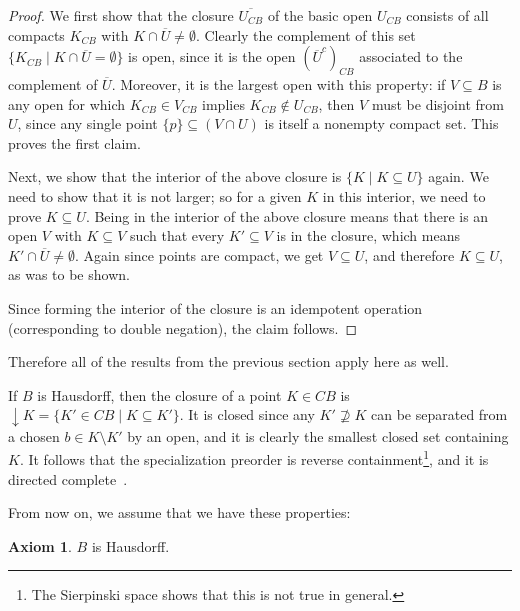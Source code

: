 \documentclass[11pt, oneside, article]{memoir}
\theoremstyle{plain}
\theoremstyle{definition}
\newtheorem{axiom}{Axiom}
\theoremstyle{remark}
\renewcommand{\ss}{\subseteq}
\newcommand{\ol}[1]{\overline{#1}}
\newcommand{\BaseSpace}{B}
\begin{document}
\begin{proof}
We first show that the closure $\ol{U_{C\BaseSpace}}$ of the basic open $U_{C\BaseSpace}$ consists of all compacts $K_{C\BaseSpace}$ with $K\cap\overline{U} \neq \emptyset$. Clearly the complement of this set $\{K_{C\BaseSpace}\mid K\cap\ol{U}=\emptyset\}$ is open, since it is the open $(\ol{U}^c)_{C\BaseSpace}$ associated to the complement of $\overline{U}$. Moreover, it is the largest open with this property: if $V\subseteq B$ is any open for which $K_{C\BaseSpace}\in V_{C\BaseSpace}$ implies $K_{C\BaseSpace} \not\in U_{C\BaseSpace}$, then $V$ must be disjoint from $U$, since any single point $\{p\}\ss(V\cap U)$ is itself a nonempty compact set. This proves the first claim.

Next, we show that the interior of the above closure is $\{ K \mid K\subseteq U\}$ again. We need to show that it is not larger; so for a given $K$ in this interior, we need to prove $K\subseteq U$. Being in the interior of the above closure means that there is an open $V$ with $K\subseteq V$ such that every $K' \subseteq V$ is in the closure, which means $K' \cap \overline{U} \neq \emptyset$. Again since points are compact, we get $V \subseteq U$, and therefore $K \subseteq U$, as was to be shown.

Since forming the interior of the closure is an idempotent operation (corresponding to double negation), the claim follows.
\end{proof}

Therefore all of the results from the previous section apply here as well.

If $\BaseSpace$ is Hausdorff, then the closure of a point $K\in C\BaseSpace$ is $\downarrow K=\{K'\in C\BaseSpace\mid K\ss K'\}$. It is closed since any $K'\not\supseteq K$ can be separated from a chosen $b\in K\setminus K'$ by an open, and it is clearly the smallest closed set containing $K$. It follows that the specialization preorder is reverse containment\footnote{The Sierpinski space shows that this is not true in general.}, and it is directed complete~\cite[Proposition~3.1]{Edalat:1995a}.


From now on, we assume that we have these properties:

\begin{axiom}
$\BaseSpace$ is Hausdorff.
\end{axiom}
\end{document}
